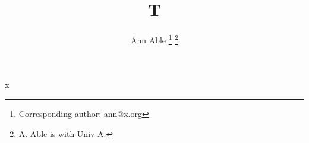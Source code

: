 \documentclass[journal]{IEEEtran}
\begin{document}
\title{T}
\author{Ann Able
\thanks{Corresponding author: ann@x.org}
\thanks{A. Able is with Univ A.}
}
\maketitle
x
\end{document}
